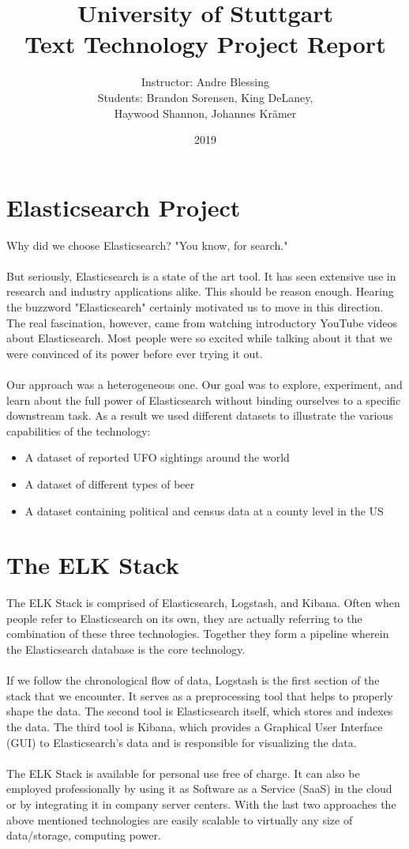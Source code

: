 \documentclass[bibliography=totoc]{article}
\title{University of Stuttgart \vspace{1em}\\Text Technology Project Report}
\author{Instructor: Andre Blessing\\Students: Brandon Sorensen, King DeLaney, \\Haywood Shannon, Johannes Krämer}
\date{2019}
\begin{document}
\maketitle


\section{Elasticsearch Project}
Why did we choose Elasticsearch? "You know, for search."
\\
\\
But seriously, Elasticsearch is a state of the art tool. It has seen extensive use in 
research and industry applications alike. This should be reason enough. Hearing the buzzword "Elasticsearch" 
certainly motivated us to move in this direction. The real fascination, however, came from watching
introductory YouTube videos about Elasticsearch. Most people were so excited while talking about it that we  were convinced of its power before ever trying it out.
\\  
\\
Our approach was a heterogeneous one. Our goal was to explore, experiment, and learn about the full power of 
Elasticsearch without binding ourselves to a specific downstream task.
As a result we used different datasets to illustrate the various capabilities of the technology:
\begin{itemize}
  \item A dataset of reported UFO sightings around the world
  \item A dataset of different types of beer
  \item A dataset containing political and census data at a county level in the US
\end{itemize}

\section{The ELK Stack}
The ELK Stack is comprised of Elasticsearch, Logstash, and Kibana.
Often when people refer to Elasticsearch on its own, they are actually referring to
the combination of these three technologies. Together they form a pipeline wherein
the Elasticsearch database is the core technology.
\\
\\
If we follow the chronological flow of data, Logstash is the first section of the
stack that we encounter. It serves as a preprocessing tool that helps to properly shape the data.
The second tool is Elasticsearch itself, which stores and indexes the data.
The third tool is Kibana, which provides a Graphical User Interface (GUI) to Elasticsearch's data 
and is responsible for visualizing the data. 
\\
\\
The ELK Stack is available for personal use free of charge. It can also be 
employed professionally by using it as Software as a Service (SaaS) in the cloud
or by integrating it in company server centers. With the last two approaches 
the above mentioned technologies are easily scalable to virtually any size of data/storage,
computing power.
\end{document}
